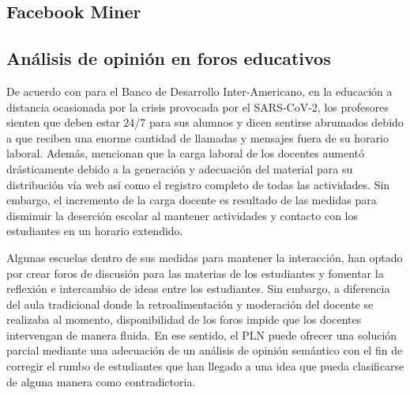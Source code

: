 \subsection{Facebook Miner}



\subsection{Análisis de opinión en foros educativos}

De acuerdo con \cite{coviddocentes} para el Banco de Desarrollo Inter-Americano, en la educación a distancia ocasionada por la crisis provocada por el SARS-CoV-2, los profesores sienten que deben estar 24/7 para sus alumnos y dicen sentirse abrumados debido a que reciben una enorme cantidad de llamadas y mensajes fuera de su horario laboral. Además, \cite{teachingcovid} mencionan que la carga laboral de los docentes aumentó drásticamente debido a la generación y adecuación del material para su distribución vía web así como el registro completo de todas las actividades. Sin embargo, el incremento de la carga docente es resultado de las medidas para disminuir la deserción escolar al mantener actividades y contacto con los estudiantes en un horario extendido.

Algunas escuelas dentro de sus medidas para mantener la interacción, han optado por crear foros de discusión para las materias de los estudiantes y fomentar la reflexión e intercambio de ideas entre los estudiantes. Sin embargo, a diferencia del aula tradicional donde la retroalimentación y moderación del docente se realizaba al momento, disponibilidad de los foros impide que los docentes intervengan de manera fluida. En ese sentido, el PLN puede ofrecer una solución parcial mediante una adecuación de un análisis de opinión semántico con el fin de corregir el rumbo de estudiantes que han llegado a una idea que pueda clasificarse de alguna manera como contradictoria.





 

